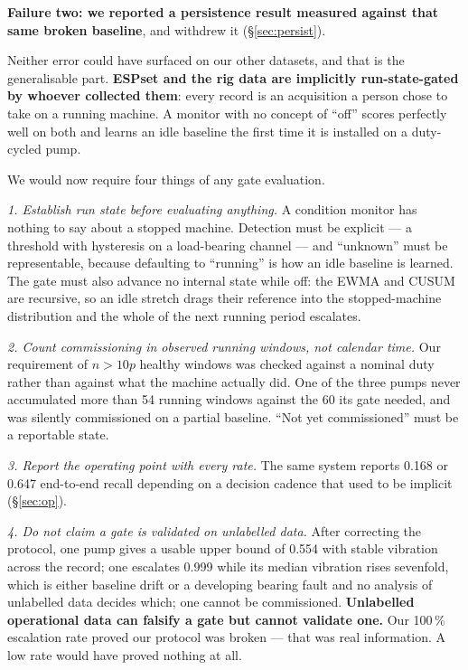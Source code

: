 \documentclass[conference,a4paper,10pt]{IEEEtran}
\begin{document}
\textbf{Failure two: we reported a persistence result measured against that same
broken baseline}, and withdrew it (\S\ref{sec:persist}).

Neither error could have surfaced on our other datasets, and that is the
generalisable part. \textbf{ESPset and the rig data are implicitly run-state-gated by
whoever collected them}: every record is an acquisition a person chose to take on a
running machine. A monitor with no concept of ``off'' scores perfectly well on both
and learns an idle baseline the first time it is installed on a duty-cycled pump.

We would now require four things of any gate evaluation.

\emph{1. Establish run state before evaluating anything.} A condition monitor has
nothing to say about a stopped machine. Detection must be explicit --- a threshold
with hysteresis on a load-bearing channel --- and ``unknown'' must be representable,
because defaulting to ``running'' is how an idle baseline is learned. The gate must
also advance no internal state while off: the EWMA and CUSUM are recursive, so an
idle stretch drags their reference into the stopped-machine distribution and the
whole of the next running period escalates.

\emph{2. Count commissioning in observed running windows, not calendar time.} Our
requirement of $n > 10p$ healthy windows was checked against a nominal duty rather
than against what the machine actually did. One of the three pumps never accumulated
more than 54 running windows against the 60 its gate needed, and was silently
commissioned on a partial baseline. ``Not yet commissioned'' must be a reportable
state.

\emph{3. Report the operating point with every rate.} The same system reports 0.168
or 0.647 end-to-end recall depending on a decision cadence that used to be implicit
(\S\ref{sec:op}).

\emph{4. Do not claim a gate is validated on unlabelled data.} After correcting the
protocol, one pump gives a usable upper bound of 0.554 with stable vibration across
the record; one escalates 0.999 while its median vibration rises sevenfold, which is
either baseline drift or a developing bearing fault and no analysis of unlabelled
data decides which; one cannot be commissioned. \textbf{Unlabelled operational data
can falsify a gate but cannot validate one.} Our 100\,\% escalation rate proved our
protocol was broken --- that was real information. A low rate would have proved
nothing at all.
\end{document}
